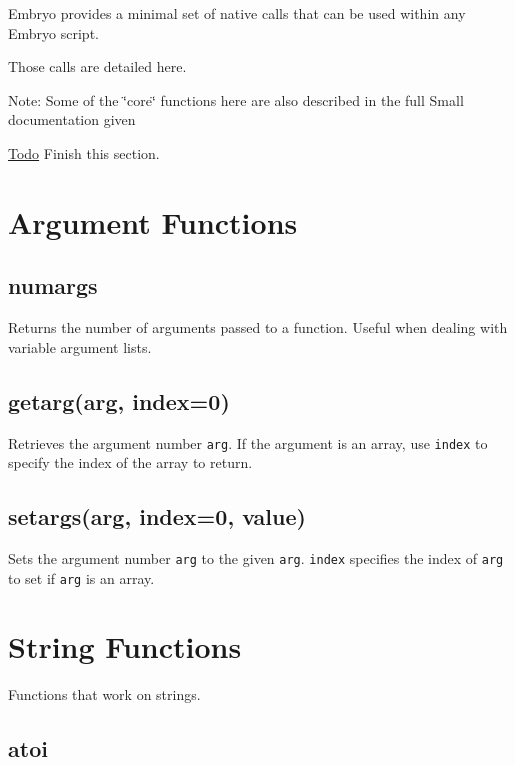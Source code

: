 Embryo provides a minimal set of native calls that can be used within any Embryo script.

Those calls are detailed here.

\begin{Desc}
\item[Note:]Some of the \char`\"{}core\char`\"{} functions here are also described in the full Small documentation given\end{Desc}
\begin{Desc}
\item[\hyperlink{todo__todo000003}{Todo}]Finish this section.\end{Desc}
\hypertarget{Available_Native_Calls_Page_Args_ANC_Section}{}\section{Argument Functions}\label{Available_Native_Calls_Page_Args_ANC_Section}
\hypertarget{Available_Native_Calls_Page_Numargs_Desc}{}\subsection{numargs}\label{Available_Native_Calls_Page_Numargs_Desc}
Returns the number of arguments passed to a function. Useful when dealing with variable argument lists.\hypertarget{Available_Native_Calls_Page_Getargs_Desc}{}\subsection{getarg(arg, index=0)}\label{Available_Native_Calls_Page_Getargs_Desc}
Retrieves the argument number {\tt arg}. If the argument is an array, use {\tt index} to specify the index of the array to return.\hypertarget{Available_Native_Calls_Page_Setargs_Desc}{}\subsection{setargs(arg, index=0, value)}\label{Available_Native_Calls_Page_Setargs_Desc}
Sets the argument number {\tt arg} to the given {\tt arg}. {\tt index} specifies the index of {\tt arg} to set if {\tt arg} is an array.\hypertarget{Available_Native_Calls_Page_String_ANC_Section}{}\section{String Functions}\label{Available_Native_Calls_Page_String_ANC_Section}
Functions that work on strings.\hypertarget{Available_Native_Calls_Page_Atoi_Desc}{}\subsection{atoi}\label{Available_Native_Calls_Page_Atoi_Desc}
